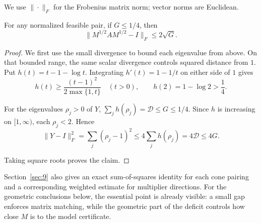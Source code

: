 We use $\|\cdot\|_F$ for the Frobenius matrix norm; vector norms are Euclidean.

\begin{lemma}\label{lem-matching}
For any normalized feasible pair, if $G\le1/4$, then
\begin{equation}\label{eq:4.6}
\|M^{1/2}AM^{1/2}-I\|_F\le2\sqrt G.
\end{equation}

\end{lemma}

\begin{proof}
We first use the small divergence to bound each eigenvalue from
above. On that bounded range, the same scalar divergence controls squared
distance from $1$. Put $h(t)=t-1-\log t$.
Integrating $h'(t)=1-1/t$ on either side of $1$ gives
\begin{equation}\label{eq:4.7}
h(t)\ge\frac{(t-1)^2}{2\max\{1,t\}}\quad(t>0),
\qquad h(2)=1-\log2>\frac14.
\end{equation}

For the eigenvalues $\rho_j>0$ of $Y$,
$\sum_jh(\rho_j)=\mathcal D\le G\le1/4$.
Since $h$ is increasing on $[1,\infty)$, each $\rho_j<2$. Hence
\begin{equation}\label{eq:4.8}
\|Y-I\|_F^2=\sum_j(\rho_j-1)^2
\le4\sum_jh(\rho_j)=4\mathcal D\le4G.
\end{equation}

Taking square roots proves the claim. 
\end{proof}

Section~\ref{sec:9} also gives an exact sum-of-squares identity for each cone pairing and a corresponding weighted estimate for multiplier directions. For the geometric conclusions below, the essential point is already visible: a small gap enforces matrix matching, while the geometric part of the deficit controls how close $M$ is to the model certificate.
